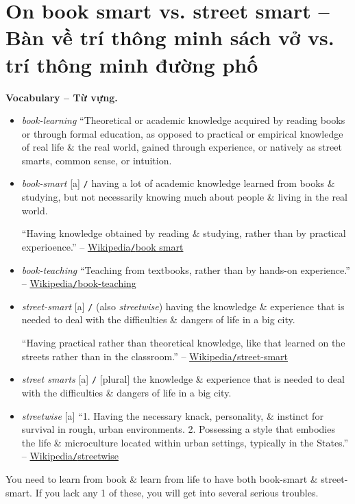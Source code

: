 \documentclass[12pt,twoside]{book}
\begin{document}

\section{On book smart vs. street smart -- Bàn về trí thông minh sách vở vs. trí thông minh đường phố}
\textbf{\textsf{\small Vocabulary -- Từ vựng.}}
\begin{itemize}\sf\small
	\item {\it book-learning} ``Theoretical or academic knowledge acquired by reading books or through formal education, as opposed to practical or empirical knowledge of real life \& the real world, gained through experience, or natively as street smarts, common sense, or intuition.
	\item {\it book-smart} [a] {\tt/} having a lot of academic knowledge learned from books \& studying, but not necessarily knowing much about people \& living in the real world.
	
	``Having knowledge obtained by reading \& studying, rather than by practical experioence.'' -- \href{https://en.wiktionary.org/wiki/book_smart#English}{Wikipedia{\tt/}book smart}
	\item {\it book-teaching} ``Teaching from textbooks, rather than by hands-on experience.'' -- \href{https://en.wiktionary.org/wiki/book-teaching#English}{Wikipedia{\tt/}book-teaching}
	\item {\it street-smart} [a] {\tt/} (also {\it streetwise}) having the knowledge \& experience that is needed to deal with the difficulties \& dangers of life in a big city.
	
	``Having practical rather than theoretical knowledge, like that learned on the streets rather than in the classroom.'' -- \href{https://en.wiktionary.org/wiki/street-smart}{Wikipedia{\tt/}street-smart}
	\item {\it street smarts} [a] {\tt/} [plural] the knowledge \& experience that is needed to deal with the difficulties \& dangers of life in a big city.
	\item {\it streetwise} [a] ``1. Having the necessary knack, personality, \& instinct for survival in rough, urban environments. 2. Possessing a style that embodies the life \& microculture located within urban settings, typically in the States.'' -- \href{https://en.wiktionary.org/wiki/streetwise#English}{Wikipedia{\tt/}streetwise}
\end{itemize}
You need to learn from book \& learn from life to have both book-smart \& street-smart. If you lack any 1 of these, you will get into several serious troubles.
\end{document}
